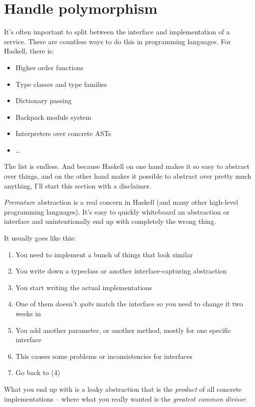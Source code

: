\section{Handle polymorphism}

It's often important to split between the interface and implementation
of a service. There are countless ways to do this in programming
languages. For Haskell, there is:

\begin{itemize}

\item
  Higher order functions
\item
  Type classes and type families
\item
  Dictionary passing
\item
  Backpack module system
\item
  Interpreters over concrete ASTs
\item
  \ldots{}
\end{itemize}
The list is endless. And because Haskell on one hand makes it so easy to
abstract over things, and on the other hand makes it possible to
abstract over pretty much anything, I'll start this section with a
disclaimer.

\emph{Premature} abstraction is a real concern in Haskell (and many
other high-level programming languages). It's easy to quickly whiteboard
an abstraction or interface and unintentionally end up with completely
the wrong thing.

It usually goes like this:

\begin{enumerate}
\def\labelenumi{\arabic{enumi}.}

\item
  You need to implement a bunch of things that look similar
\item
  You write down a typeclass or another interface-capturing abstraction
\item
  You start writing the actual implementations
\item
  One of them doesn't \emph{quite} match the interface so you need to
  change it two weeks in
\item
  You add another parameter, or another method, mostly for one specific
  interface
\item
  This causes some problems or inconsistencies for interfaces
\item
  Go back to (4)
\end{enumerate}
What you end up with is a leaky abstraction that is the \emph{product}
of all concrete implementations -- where what you really wanted is the
\emph{greatest common divisor}.

